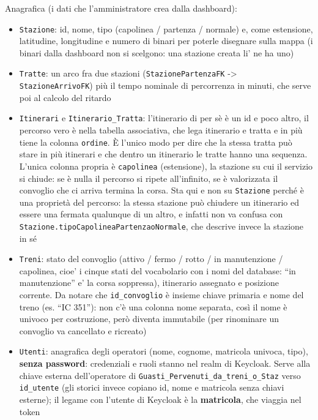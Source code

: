 \documentclass[11pt]{article}
\begin{document}
Anagrafica (i dati che l'amministratore crea dalla dashboard):
\begin{itemize}
\item \texttt{Stazione}: id, nome, tipo (capolinea / partenza / normale) e, come estensione,
latitudine, longitudine e numero di binari per poterle disegnare sulla mappa (i binari dalla
dashboard non si scelgono: una stazione creata li' ne ha uno)
\item \texttt{Tratte}: un arco fra due stazioni (\texttt{StazionePartenzaFK} -> \texttt{StazioneArrivoFK}) più il
tempo nominale di percorrenza in minuti, che serve poi al calcolo del ritardo
\item \texttt{Itinerari} e \texttt{Itinerario\_Tratta}: l'itinerario di per sè è un id e poco altro, il percorso
vero è nella tabella associativa, che lega itinerario e tratta e in più tiene la colonna
\texttt{ordine}. È l'unico modo per dire che la stessa tratta può stare in più itinerari e che
dentro un itinerario le tratte hanno una sequenza. L'unica colonna propria è \texttt{capolinea}
(estensione), la stazione su cui il servizio si chiude: se è nulla il percorso si ripete
all'infinito, se è valorizzata il convoglio che ci arriva termina la corsa. Sta qui e non su
\texttt{Stazione} perché è una proprietà del percorso: la stessa stazione può chiudere un itinerario ed
essere una fermata qualunque di un altro, e infatti non va confusa con
\texttt{Stazione.tipoCapolineaPartenzaoNormale}, che descrive invece la stazione in sé
\item \texttt{Treni}: stato del convoglio (attivo / fermo / rotto / in manutenzione / capolinea, cioe' i
cinque stati del vocabolario con i nomi del database: ``in manutenzione'' e' la corsa soppressa),
itinerario assegnato e posizione corrente. Da notare che \texttt{id\_convoglio} è insieme chiave primaria e
nome del treno (es. ``IC 351''): non c'è una colonna nome separata, così il nome è univoco
per costruzione, però diventa immutabile (per rinominare un convoglio va cancellato e
ricreato)
\item \texttt{Utenti}: anagrafica degli operatori (nome, cognome, matricola univoca, tipo), \textbf{senza password}:
credenziali e ruoli stanno nel realm di Keycloak. Serve alla chiave esterna dell'operatore di
\texttt{Guasti\_Pervenuti\_da\_treni\_o\_Staz} verso \texttt{id\_utente} (gli storici invece copiano id, nome e
matricola senza chiavi esterne); il legame con l'utente di Keycloak è la \textbf{matricola}, che viaggia
nel token
\end{itemize}
\end{document}
